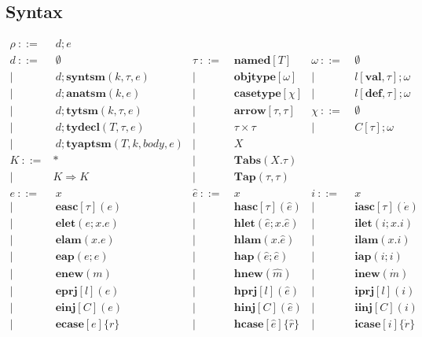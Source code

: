 \documentclass[letterpaper, notitlepage]{article}
\begin{document}
\subsection{Syntax}
\[
\begin{array}{rlrlrl}
	\rho		~::=&~ {d};e\\				
	{d}		~::=&~ \emptyset								&\tau 		~::=&~ \mathbf{named}[T]	& \omega 		~::=&~ 	\emptyset\\
				| ~	&~ {d}; \mathbf{syntsm}(k,\tau,e)	&|~	& ~ \mathbf{objtype}[\omega]		& |~&  	~l[\mathbf{val}, \tau];\omega\\
				| ~	&~ {d}; \mathbf{anatsm}(k,e)		&|~	& ~ \mathbf{casetype}[\chi]			& |~&	~l[\mathbf{def}, \tau];\omega\\
				| ~	&~ {d};\mathbf{tytsm}(k,\tau,e)				&|~ & ~ \mathbf{arrow}[\tau, \tau]		& \chi 			~::=&~	\emptyset ~ \\
				| ~ &~ {d};\mathbf{tydecl}(T,\tau,e)			&|~	& ~ \tau\times\tau									& |~&	~C[\tau];\omega\\
				| ~ &~ {d};\mathbf{tyaptsm}(T,k,body,e)			&|~ & ~ X\\
	K           ~::=& *											&|~ & ~ \mathbf{Tabs}(X.\tau)\\
				| ~ & K\Rightarrow K 							&|~ & ~ \mathbf{Tap}(\tau,\tau)\\
	e 			~::=&~ x 								&\hat{e}	~::=&~ 	x 										& i 		~::=&~ 	x\\
				| ~ &~ \mathbf{easc}[\tau](e)			& 		 	| ~ &~ 	\mathbf{hasc}[\tau](\hat{e})			& 		 	| ~ &~	\mathbf{iasc}[\tau](\dot{e})\\
				| ~ &~ \mathbf{elet}(e; x.e)     		& 		 	| ~ &~ 	\mathbf{hlet}(\hat{e}; x.\hat{e})		& 		 	| ~ &~	\mathbf{ilet}(i;x.i)\\
				| ~ &~ \mathbf{elam}(x.e)     			& 		 	| ~ &~ 	\mathbf{hlam}(x.\hat{e})				& 		 	| ~ &~	\mathbf{ilam}(x.i)\\
				| ~ &~ \mathbf{eap}(e;e)     			& 		 	| ~ &~ 	\mathbf{hap}(\hat{e};\hat{e})			& 		 	| ~ &~	\mathbf{iap}(i;i)\\
				| ~ &~ \mathbf{enew}(m)     			& 		 	| ~ &~	\mathbf{hnew}(\hat{m})					& 		 	| ~ &~	\mathbf{inew}(\dot{m})\\
				| ~ &~ \mathbf{eprj}[l](e)     			& 		 	| ~ &~	\mathbf{hprj}[l](\hat{e})				& 		 	| ~ &~	\mathbf{iprj}[l](i)\\
				| ~ &~ \mathbf{einj}[C](e)     			& 		 	| ~ &~	\mathbf{hinj}[C](\hat{e})				& 		 	| ~ &~	\mathbf{iinj}[C](i)\\
				| ~ &~ \mathbf{ecase}[e]\{r\}     		& 		 	| ~ &~	\mathbf{hcase}[\hat{e}]\{\hat{r}\}		& 		 	| ~ &~	\mathbf{icase}[i]\{\dot{r}\}\\

\end{array}\]
\end{document}
